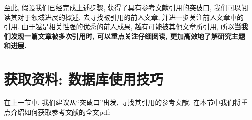 \documentclass{booki}
\begin{document}
至此, 假设我们已经完成上述步骤, 获得了具有参考文献引用的突破口, 我们可以阅读其对于领域进展的概述, 去寻找被引用的前人文章, 并进一步关注前人文章中的引用. 由于越是相关性强的优秀的前人成果, 越有可能被其他文章所引用, 所以\textbf{当我们发现一篇文章被多次引用时, 可以重点关注仔细阅读, 更加高效地了解研究主题和进展.}

\section{获取资料: 数据库使用技巧}
{在上一节中, 我们建议从``突破口''出发, 寻找其引用的参考文献. 在本节中我们将重点介绍如何获取参考文献的全文pdf:
\begin{center}
    \noindent{}
\end{center}}
\end{document}

